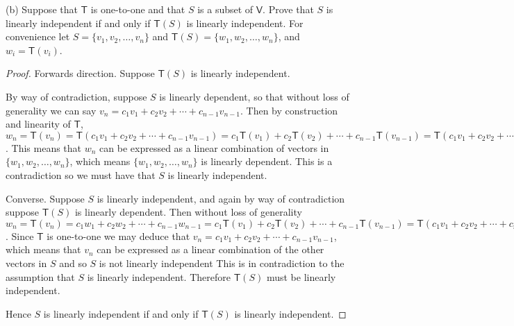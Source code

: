 \documentclass[11pt]{article}
\newcommand{\cbr}[1]{\{#1\}}
\begin{document}
(b) Suppose that $\mathsf{T}$ is one-to-one and that $S$ is a subset of $\mathsf{V}$. Prove that $S$ is linearly independent if and only if $\mathsf{T}(S)$ is linearly independent. For convenience let $S = \cbr{v_1,v_2,\dots,v_n}$ and $\mathsf{T}(S) = \cbr{w_1,w_2,\dots,w_n}$, and $w_i = \mathsf{T}(v_i)$.

\begin{proof}
    Forwards direction. Suppose $\mathsf{T}(S)$ is linearly independent. 

    By way of contradiction, suppose $S$ is linearly dependent, so that without loss of generality we can say $v_n = c_1v_1 + c_2v_2 + \cdots + c_{n-1}v_{n-1}$. Then by construction and linearity of $\mathsf{T}$, $w_n = \mathsf{T}(v_n) = \mathsf{T}(c_1v_1 + c_2v_2 + \cdots + c_{n-1}v_{n-1}) = c_1\mathsf{T}(v_1) + c_2\mathsf{T}(v_2) + \cdots + c_{n-1}\mathsf{T}(v_{n-1}) = \mathsf{T}(c_1v_1 + c_2v_2 + \cdots + c_{n-1}v_{n-1}) = c_1w_1 + c_2w_2 + \cdots + c_{n-1}w_{n-1}$. This means that $w_n$ can be expressed as a linear combination of vectors in $\cbr{w_1,w_2,\dots,w_n}$, which means $\cbr{w_1,w_2,\dots,w_n}$ is linearly dependent. This is a contradiction so we must have that $S$ is linearly independent.

    Converse. Suppose $S$ is linearly independent, and again by way of contradiction suppose $\mathsf{T}(S)$ is linearly dependent. Then without loss of generality $w_n = \mathsf{T}(v_n) = c_1w_1 + c_2w_2 + \cdots + c_{n-1}w_{n-1} = c_1\mathsf{T}(v_1) + c_2\mathsf{T}(v_2) + \cdots + c_{n-1}\mathsf{T}(v_{n-1}) = \mathsf{T}(c_1v_1 + c_2v_2 + \cdots + c_{n-1}v_{n-1})$. Since $\mathsf{T}$ is one-to-one we may deduce that $v_n = c_1v_1 + c_2v_2 + \cdots + c_{n-1}v_{n-1}$, which means that $v_n$ can be expressed as a linear combination of the other vectors in $S$ and so $S$ is not linearly independent This is in contradiction to the assumption that $S$ is linearly independent. Therefore $\mathsf{T}(S)$ must be linearly independent.
    
    Hence $S$ is linearly independent if and only if $\mathsf{T}(S)$ is linearly independent.
\end{proof}
\end{document}
